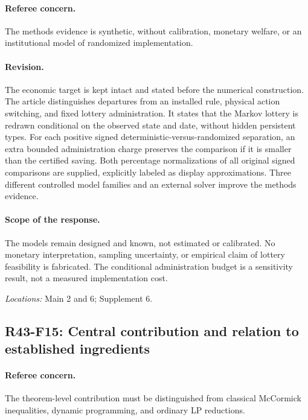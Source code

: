 \paragraph*{Referee concern.} The methods evidence is synthetic, without calibration, monetary welfare, or an institutional model of randomized implementation.

\paragraph*{Revision.} The economic target is kept intact and stated before the numerical construction. The article distinguishes departures from an installed rule, physical action switching, and fixed lottery administration. It states that the Markov lottery is redrawn conditional on the observed state and date, without hidden persistent types. For each positive signed deterministic-versus-randomized separation, an extra bounded administration charge preserves the comparison if it is smaller than the certified saving. Both percentage normalizations of all original signed comparisons are supplied, explicitly labeled as display approximations. Three different controlled model families and an external solver improve the methods evidence.

\paragraph*{Scope of the response.} The models remain designed and known, not estimated or calibrated. No monetary interpretation, sampling uncertainty, or empirical claim of lottery feasibility is fabricated. The conditional administration budget is a sensitivity result, not a measured implementation cost.

\noindent\textit{Locations:} Main 2 and 6; Supplement 6.

\subsection{R43-F15: Central contribution and relation to established ingredients}
\paragraph*{Referee concern.} The theorem-level contribution must be distinguished from classical McCormick inequalities, dynamic programming, and ordinary LP reductions.


